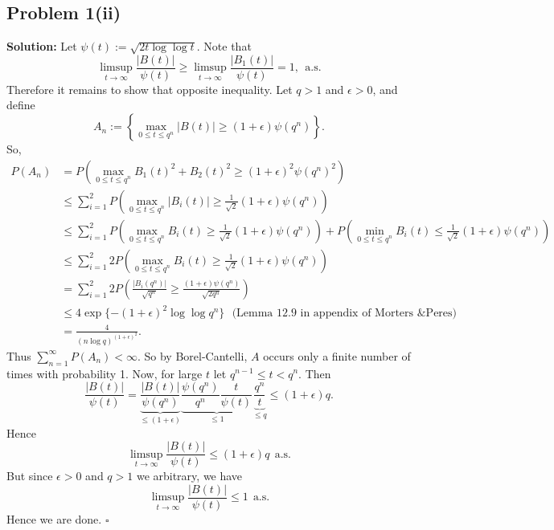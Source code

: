 \documentclass[12pt]{article}
\newcounter{ProofCounter}
\newenvironment{Solution}{\stepcounter{ProofCounter}\textbf{Solution:}}{\hfill$\square$}
\newcommand\toinf{\rightarrow\infty}
\begin{document}
\subsection*{Problem 1(ii)}
\begin{Solution}
  Let $\psi(t) := \sqrt{2t\log\log t}$. Note that
  \[
    \limsup_{t\rightarrow\infty} \frac{|B(t)|}{\psi(t)} \geq \limsup_{t\rightarrow\infty} \frac{|B_1(t)|}{\psi(t)} = 1, \ \ \text{a.s.}
  \]
  Therefore it remains to show that opposite inequality. Let $q > 1$ and $\epsilon > 0$, and define
  \[
    A_n := \left\{ \max_{0\leq t \leq q^n}|B(t)| \geq (1 + \epsilon) \psi(q^n) \right\}.
  \]
  So,
  \begin{align*}
    P(A_n) & = P \left( \max_{0\leq t \leq q^n} B_1(t)^2 + B_2(t)^2 \geq (1 + \epsilon)^2\psi(q^n)^2 \right) \\
    & \leq \sum_{i=1}^{2} P \left( \max_{0\leq t \leq q^n} |B_i(t)| \geq \frac{1}{\sqrt{2}}(1 + \epsilon)\psi(q^n) \right) \\
    & \leq \sum_{i=1}^{2} P \left( \max_{0\leq t \leq q^n} B_i(t) \geq \frac{1}{\sqrt{2}}(1 + \epsilon)\psi(q^n) \right) + P \left( \min_{0\leq t \leq q^n} B_i(t) \leq \frac{1}{\sqrt{2}}(1 + \epsilon)\psi(q^n) \right) \\
    & \leq \sum_{i=1}^{2} 2 P \left( \max_{0\leq t \leq q^n} B_i(t) \geq \frac{1}{\sqrt{2}}(1 + \epsilon)\psi(q^n) \right) \\
    & = \sum_{i=1}^{2} 2 P \left( \frac{|B_i(q^n)|}{\sqrt{q^n}} \geq \frac{(1 + \epsilon)\psi(q^n)}{\sqrt{2q^n}} \right) \\
    & \leq 4 \exp\{ -(1 + \epsilon)^2 \log \log q^n \} \ \ \ \text{(Lemma 12.9 in appendix of Morters \& Peres)} \\
    & = \frac{4}{(n\log q)^{(1+\epsilon)^2}}.
  \end{align*}
  Thus $\sum_{n=1}^{\infty} P(A_n) < \infty$. So by Borel-Cantelli, $A$ occurs only a finite number of times with probability 1. Now, for large $t$ let $q^{n-1} \leq t < q^{n}$. Then
  \[
    \frac{|B(t)|}{\psi(t)} = \underbrace{\frac{|B(t)|}{\psi(q^n)}}_{\leq (1 + \epsilon)} \underbrace{\frac{\psi(q^n)}{q^n} \frac{t}{\psi(t)}}_{\leq 1} \underbrace{\frac{q^n}{t}}_{\leq q} \leq (1 + \epsilon) q.
  \]
  Hence
  \[
    \limsup_{t \rightarrow \infty} \frac{|B(t)|}{\psi(t)} \leq (1 + \epsilon)q \ \ \text{a.s.}
  \]
  But since $\epsilon > 0$ and $q > 1$ we arbitrary, we have
  \[
    \limsup_{t\toinf} \frac{|B(t)|}{\psi(t)} \leq 1 \ \ \text{a.s.}
  \]
  Hence we are done.
\end{Solution}
\end{document}
